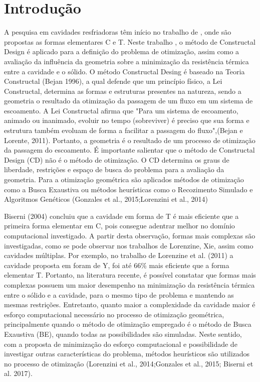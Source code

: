 \documentclass[12pt,A4,A4pt]{article}
\begin{document}

\newpage
 \onehalfspacing
\section{Introdução}

 {\fontsize{12pt}{\baselineskip}\selectfont}
 
\hspace{0.5cm}A pesquisa em cavidades resfriadoras têm início no trabalho de , onde são propostas as formas elementares C e T. Neste trabalho \cite{Biserni2004}, o método de Constructal Design é aplicado para a definição do problema de otimização, assim como a avaliação da influência da geometria sobre a minimização da resistência térmica entre a cavidade e o sólido. O método Constructal Desing é baseado na Teoria Constructal (Bejan 1996), a qual defende que um princípio físico, a Lei Constructal, determina as formas e estruturas presentes na natureza, sendo a geometria o resultado da otimização da passagem de um fluxo em um sistema de escoamento. A Lei Constructal afirma que "Para um sistema de escoamento, animado ou inanimado, evoluir no tempo (sobreviver) é preciso que sua forma e estrutura também evoluam de forma a facilitar a passagem do fluxo",(Bejan e Lorente, 2011). Portanto, a geometria é o resultado de um processo de otimização da passagem do escoamento. É importante salientar que o método de Constructal Design (CD) não é o método de otimização. O CD determina os graus de liberdade, restrições e espaço de busca do problema para a avaliação da geometria. Para a otimização geométrica são aplicados métodos de otimização como a Busca Exaustiva ou métodos heurísticas como o Recozimento Simulado e Algoritmos Genéticos (Gonzales et al., 2015;Lorenzini et al., 2014)

Biserni (2004) concluiu que a cavidade em forma de T é mais eficiente que a primeira forma elementar em C, pois consegue adentrar melhor no domínio computacional investigado. A partir desta observação, formas mais complexas são investigadas, como se pode observar nos trabalhos de Lorenzine, Xie, assim como cavidades múltiplas. Por exemplo, no trabalho de Lorenzine et al. (2011) a cavidade proposta em foram de Y, foi até 66\% mais eficiente que a forma elementar T. Portanto, na literatura recente, é possível constatar que formas mais complexas possuem um maior desempenho na minimização da resistência térmica entre o sólido e a cavidade, para o mesmo tipo de problema e mantendo as mesmas restrições. Entretanto, quanto maior a complexidade da cavidade maior é esforço computacional necessário no processo de otimização geométrica, principalmente quando o método de otimização empregado é o método de Busca Exaustiva (BE), quando todas as possibilidades são simuladas. Neste sentido, com a proposta de minimização do esforço computacional e possibilidade de investigar outras características do problema, métodos heurísticos são utilizados no processo de otimização (Lorenzini et al., 2014;Gonzales et al., 2015; Biserni et al. 2017).
\end{document}
